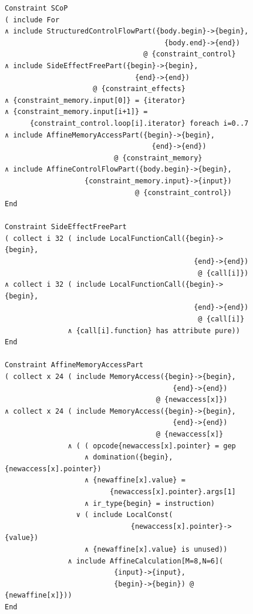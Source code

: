 \begin{figure}[p]
\begin{lstlisting}[language=CAnDL,basicstyle=\linespread{1}\small\ttfamily,
                   label=polyhedralCAnDL, caption=
   {Fragments from the specification of Scalar Control Parts (SCoPs) in CAnDL:
    In lines 1--18, SCoPs are defined by combining multiple restrictions on
    loop nests.
    These restrictions are then individually implemented in CAnDL, including the
    {\tt SideEffectFreePart} and {\tt AffineMemoryAccessPart}
    conditions that are shown.
    The entire listing is in Appendix \ref{appendix:CAnDLpoly}.\parfillskip=0pt}]
Constraint SCoP
( include For
∧ include StructuredControlFlowPart({body.begin}->{begin},
                                      {body.end}->{end})
                                 @ {constraint_control}
∧ include SideEffectFreePart({begin}->{begin},
                               {end}->{end})
                     @ {constraint_effects}
∧ {constraint_memory.input[0]} = {iterator}
∧ {constraint_memory.input[i+1]} =
      {constraint_control.loop[i].iterator} foreach i=0..7
∧ include AffineMemoryAccessPart({begin}->{begin},
                                   {end}->{end})
                          @ {constraint_memory}
∧ include AffineControlFlowPart({body.begin}->{begin},
                   {constraint_memory.input}->{input})
                               @ {constraint_control})
End

Constraint SideEffectFreePart
( collect i 32 ( include LocalFunctionCall({begin}->{begin},
                                             {end}->{end})
                                              @ {call[i]}) 
∧ collect i 32 ( include LocalFunctionCall({begin}->{begin},
                                             {end}->{end})
                                              @ {call[i]}
               ∧ {call[i].function} has attribute pure))
End

Constraint AffineMemoryAccessPart
( collect x 24 ( include MemoryAccess({begin}->{begin},
                                        {end}->{end})
                                    @ {newaccess[x]})
∧ collect x 24 ( include MemoryAccess({begin}->{begin},
                                        {end}->{end})
                                    @ {newaccess[x]}
               ∧ ( ( opcode{newaccess[x].pointer} = gep
                   ∧ domination({begin}, {newaccess[x].pointer})
                   ∧ {newaffine[x].value} =
                         {newaccess[x].pointer}.args[1]
                   ∧ ir_type{begin} = instruction)
                 ∨ ( include LocalConst(
                              {newaccess[x].pointer}->{value})
                   ∧ {newaffine[x].value} is unused))
               ∧ include AffineCalculation[M=8,N=6](
                          {input}->{input},
                          {begin}->{begin}) @ {newaffine[x]}))
End
\end{lstlisting}
\end{figure}


